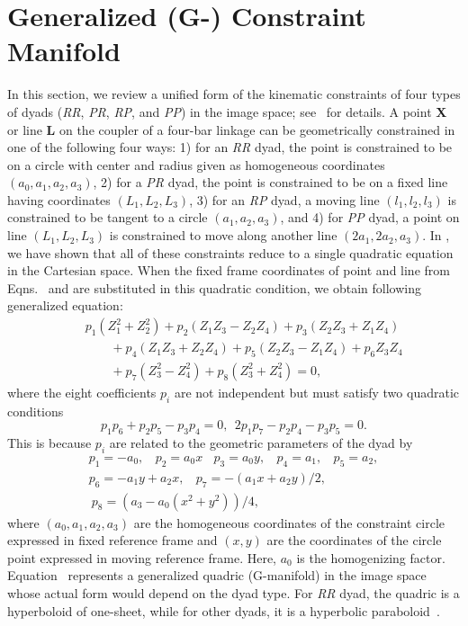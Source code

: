 \section{Generalized (G-) Constraint Manifold}\label{gman}
In this section, we review a unified form of the kinematic constraints of four types of dyads (\emph{RR}, \emph{PR}, \emph{RP}, and \emph{PP}) in the image space; see~\cite{generalfitting-JCISE} for details.
A point \textbf{X} or line \textbf{L} on the coupler of a four-bar linkage can be geometrically constrained in one of the following four ways: 1) for an \emph{RR} dyad, the point is constrained to be on a circle with center and radius given as homogeneous coordinates $(a_0,a_1,a_2, a_3)$,  2) for a \emph{PR} dyad, the point is constrained to be on a fixed line having coordinates $(L_1,L_2,L_3)$, 3) for an \emph{RP} dyad, a moving line $(l_1,l_2,l_3)$ is constrained to be tangent to a circle $(a_1,a_2,a_3)$, and 4) for \emph{PP} dyad, a point on line $(L_1,L_2,L_3)$ is constrained to move along another line $(2a_1,2a_2,a_3)$. In \cite{generalfitting-JCISE}, we have shown that all of these constraints reduce to a single quadratic equation in the Cartesian space. When the fixed frame coordinates of point and line from Eqns.~ and  are substituted in this quadratic condition, we obtain following generalized equation:
\begin{eqnarray}\label{general}
& & p_1(Z_1^2+Z_2^2)+p_2(Z_1Z_3-Z_2Z_4)+p_3(Z_2Z_3+Z_1Z_4) \nonumber \\
& & \ \ \ \ \ \ \ \ \  + p_4(Z_1Z_3+Z_2Z_4) +p_5(Z_2Z_3-Z_1Z_4)+p_6Z_3Z_4 \nonumber \\ & & \ \ \ \ \ \ \ \ \ +p_7(Z_3^2-Z_4^2)+p_{8}(Z_3^2+Z_4^2)=0,
\end{eqnarray}
where the eight coefficients $p_i$ are not independent but must satisfy two quadratic conditions
\begin{equation}\label{2relation}
p_1p_6 +p_2p_5-p_3p_4 = 0 , \ \
2p_1p_7-p_2p_4 -p_3p_5 = 0.
\end{equation}
This is because   $p_i$ are related to the geometric parameters of the dyad by
\begin{equation}\label{8p}
\begin{array}{l}
p_1=-a_0, \ \ \ \ p_2 = a_0x  \ \ \ \  p_3 = a_0y, \ \ \ \
p_4 = a_1, \ \ \ \  p_5 = a_2,   \\
p_6 = -a_1y+a_2x, \ \ \ \ p_7=-(a_1x+a_2y)/2, \ \ \ \\\
p_8 =(a_3-a_0(x^2+y^2))/4,
\end{array}
\end{equation}
where $(a_0,a_1,a_2,a_3)$ are the homogeneous coordinates of the constraint circle expressed in fixed reference frame and $(x,y)$
are the coordinates of the circle point expressed in moving reference frame. Here, $a_0$ is the homogenizing factor. Equation~ represents a generalized quadric (G-manifold) in the image space whose actual form would depend on the dyad type. For \emph{RR} dyad, the quadric is a hyperboloid of one-sheet, while for other dyads, it is a hyperbolic paraboloid~\cite{McCarthy90}.

